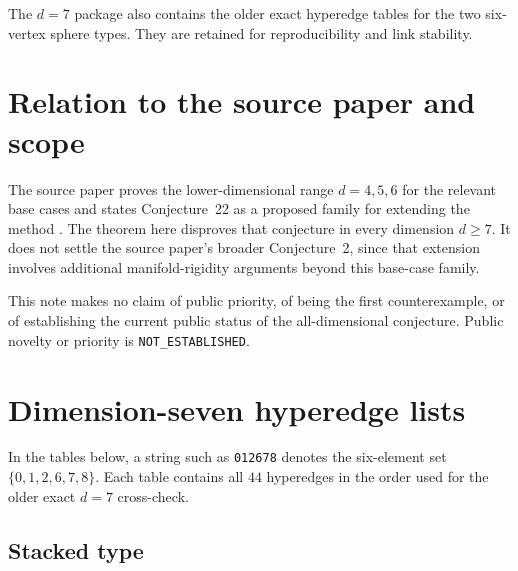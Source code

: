 \documentclass[11pt]{article}
\theoremstyle{definition}
\begin{document}
The \(d=7\) package also contains the older exact hyperedge tables for
the two six-vertex sphere types.  They are retained for reproducibility
and link stability.

\section{Relation to the source paper and scope}

The source paper proves the lower-dimensional range \(d=4,5,6\) for
the relevant base cases and states Conjecture~22 as a proposed family
for extending the method
\cite{CruickshankJacksonTanigawa2026}.  The theorem here disproves
that conjecture in every dimension \(d\geq 7\).  It does not settle the
source paper's broader Conjecture~2, since that extension involves
additional manifold-rigidity arguments beyond this base-case family.

This note makes no claim of public priority, of being the first
counterexample, or of establishing the current public status of the
all-dimensional conjecture.  Public novelty or priority is
\texttt{NOT\_ESTABLISHED}.

\appendix
\section{Dimension-seven hyperedge lists}
\label{app:hyperedges}

In the tables below, a string such as \texttt{012678} denotes the
six-element set \(\{0,1,2,6,7,8\}\).  Each table contains all \(44\)
hyperedges in the order used for the older exact \(d=7\) cross-check.

\subsection*{Stacked type}
\end{document}
